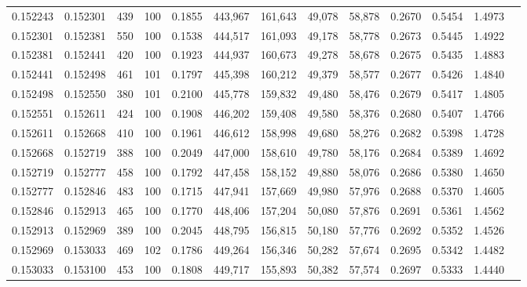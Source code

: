 \begin{tabular}{rrrrrrrrrrrrr}
0.152243 & 0.152301 &   439 & 100 &                                     0.1855 & 443,967 & 161,643 &  49,078 &  58,878 & 0.2670 & 0.5454 & 1.4973 \\
0.152301 & 0.152381 &   550 & 100 &                                     0.1538 & 444,517 & 161,093 &  49,178 &  58,778 & 0.2673 & 0.5445 & 1.4922 \\
0.152381 & 0.152441 &   420 & 100 &                                     0.1923 & 444,937 & 160,673 &  49,278 &  58,678 & 0.2675 & 0.5435 & 1.4883 \\
0.152441 & 0.152498 &   461 & 101 &                                     0.1797 & 445,398 & 160,212 &  49,379 &  58,577 & 0.2677 & 0.5426 & 1.4840 \\
0.152498 & 0.152550 &   380 & 101 &                                     0.2100 & 445,778 & 159,832 &  49,480 &  58,476 & 0.2679 & 0.5417 & 1.4805 \\
0.152551 & 0.152611 &   424 & 100 &                                     0.1908 & 446,202 & 159,408 &  49,580 &  58,376 & 0.2680 & 0.5407 & 1.4766 \\
0.152611 & 0.152668 &   410 & 100 &                                     0.1961 & 446,612 & 158,998 &  49,680 &  58,276 & 0.2682 & 0.5398 & 1.4728 \\
0.152668 & 0.152719 &   388 & 100 &                                     0.2049 & 447,000 & 158,610 &  49,780 &  58,176 & 0.2684 & 0.5389 & 1.4692 \\
0.152719 & 0.152777 &   458 & 100 &                                     0.1792 & 447,458 & 158,152 &  49,880 &  58,076 & 0.2686 & 0.5380 & 1.4650 \\
0.152777 & 0.152846 &   483 & 100 &                                     0.1715 & 447,941 & 157,669 &  49,980 &  57,976 & 0.2688 & 0.5370 & 1.4605 \\
0.152846 & 0.152913 &   465 & 100 &                                     0.1770 & 448,406 & 157,204 &  50,080 &  57,876 & 0.2691 & 0.5361 & 1.4562 \\
0.152913 & 0.152969 &   389 & 100 &                                     0.2045 & 448,795 & 156,815 &  50,180 &  57,776 & 0.2692 & 0.5352 & 1.4526 \\
0.152969 & 0.153033 &   469 & 102 &                                     0.1786 & 449,264 & 156,346 &  50,282 &  57,674 & 0.2695 & 0.5342 & 1.4482 \\
0.153033 & 0.153100 &   453 & 100 &                                     0.1808 & 449,717 & 155,893 &  50,382 &  57,574 & 0.2697 & 0.5333 & 1.4440 \\

\end{tabular}
